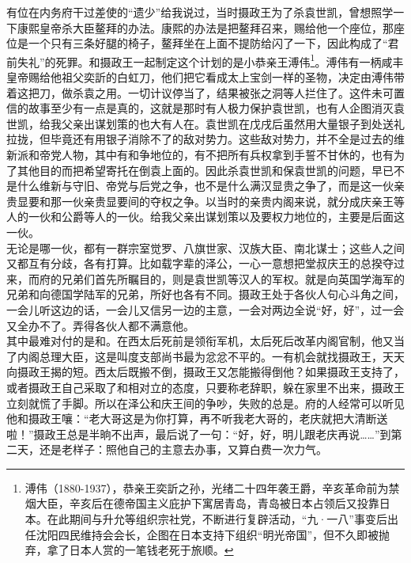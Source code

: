 有位在内务府干过差使的“遗少”给我说过，当时摄政王为了杀袁世凯，曾想照学一下康熙皇帝杀大臣鳌拜的办法。康熙的办法是把鳌拜召来，赐给他一个座位，那座位是一个只有三条好腿的椅子，鳌拜坐在上面不提防给闪了一下，因此构成了“君前失礼”的死罪。和摄政王一起制定这个计划的是小恭亲王溥伟\footnote{溥伟（1880-1937），恭亲王奕訢之孙，光绪二十四年袭王爵，辛亥革命前为禁烟大臣，辛亥后在德帝国主义庇护下寓居青岛，青岛被日本占领后又投靠日本。在此期间与升允等组织宗社党，不断进行复辟活动，“九·一八”事变后出任沈阳四民维持会会长，企图在日本支持下组织“明光帝国”，但不久即被抛弃，拿了日本人赏的一笔钱老死于旅顺。}。溥伟有一柄咸丰皇帝赐给他祖父奕訢的白虹刀，他们把它看成太上宝剑一样的圣物，决定由溥伟带着这把刀，做杀袁之用。一切计议停当了，结果被张之洞等人拦住了。这件未可置信的故事至少有一点是真的，这就是那时有人极力保护袁世凯，也有人企图消灭袁世凯，给我父亲出谋划策的也大有人在。袁世凯在戊戌后虽然用大量银子到处送礼拉拢，但毕竟还有用银子消除不了的敌对势力。这些敌对势力，并不全是过去的维新派和帝党人物，其中有和争地位的，有不把所有兵权拿到手誓不甘休的，也有为了其他目的而把希望寄托在倒袁上面的。因此杀袁世凯和保袁世凯的问题，早已不是什么维新与守旧、帝党与后党之争，也不是什么满汉显贵之争了，而是这一伙亲贵显要和那一伙亲贵显要间的夺权之争。以当时的亲贵内阁来说，就分成庆亲王等人的一伙和公爵等人的一伙。给我父亲出谋划策以及要权力地位的，主要是后面这一伙。\\

无论是哪一伙，都有一群宗室觉罗、八旗世家、汉族大臣、南北谋士；这些人之间又都互有分歧，各有打算。比如载字辈的泽公，一心一意想把堂叔庆王的总揆夺过来，而府的兄弟们首先所瞩目的，则是袁世凯等汉人的军权。就是向英国学海军的兄弟和向德国学陆军的兄弟，所好也各有不同。摄政王处于各伙人句心斗角之间，一会儿听这边的话，一会儿又信另一边的主意，一会对两边全说“好，好”，过一会又全办不了。弄得各伙人都不满意他。\\

其中最难对付的是和。在西太后死前是领衔军机，太后死后改革内阁官制，他又当了内阁总理大臣，这是叫度支部尚书最为忿忿不平的。一有机会就找摄政王，天天向摄政王揭的短。西太后既搬不倒，摄政王又怎能搬得倒他？如果摄政王支持了，或者摄政王自己采取了和相对立的态度，只要称老辞职，躲在家里不出来，摄政王立刻就慌了手脚。所以在泽公和庆王间的争吵，失败的总是。府的人经常可以听见他和摄政王嚷：“老大哥这是为你打算，再不听我老大哥的，老庆就把大清断送啦！”摄政王总是半晌不出声，最后说了一句：“好，好，明儿跟老庆再说……”到第二天，还是老样子：照他自己的主意去办事，又算白费一次力气。\\

